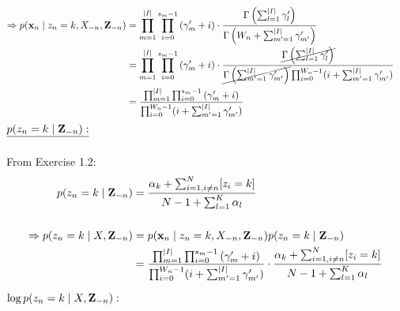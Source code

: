 \begin{enumerate}
\begin{align*}
        \\\\
        \Rightarrow p(\bold{x}_n \mid  z_n = k, X_{-n}, \mathbf{Z}_{-n}) &= \prod_{m=1}^{\vert I \vert}\prod_{i=0}^{s_m-1}\left(\gamma'_m + i\right) \cdot \frac{\Gamma\left(\sum_{l=1}^{\vert I \vert} \gamma'_l\right)}{\Gamma\left(W_n + \sum_{m'=1}^{\vert I \vert} \gamma'_{m'}\right)} 
        \\
        &= \prod_{m=1}^{\vert I \vert}\prod_{i=0}^{s_m-1}\left(\gamma'_m + i\right) \cdot \frac{\cancel{\Gamma\left(\sum_{l=1}^{\vert I \vert} \gamma'_l\right)}}{\cancel{\Gamma\left(\sum_{m'=1}^{\vert I \vert} \gamma'_{m'}\right)}\prod_{i=0}^{W_n-1}(i+\sum_{m'=1}^{\vert I \vert} \gamma'_{m'})} 
        \\
        &= \frac{\prod_{m=1}^{\vert I \vert}\prod_{i=0}^{s_m-1}\left(\gamma'_m + i\right)}{\prod_{i=0}^{W_n-1}(i+\sum_{m'=1}^{\vert I \vert} \gamma'_{m'})}
    \end{align*}
    \textbf{$\underline{p(z_n = k \mid \mathbf{Z}_{-n}):}$}
    \\\\
    From Exercise 1.2:
    \begin{align*}
       p(z_n = k \mid \mathbf{Z}_{-n}) &= \frac{\alpha_k + \sum_{i=1, i \neq n}^N[z_i = k]}{N - 1 + \sum_{l=1}^K \alpha_l} 
       \\\\
       \Rightarrow p(z_n = k \mid X, \mathbf{Z}_{-n}) &= p(\bold{x}_n \mid  z_n = k, X_{-n}, \mathbf{Z}_{-n})p(z_n = k \mid \mathbf{Z}_{-n})
       \\
       &= \frac{\prod_{m=1}^{\vert I \vert}\prod_{i=0}^{s_m-1}\left(\gamma'_m + i\right)}{\prod_{i=0}^{W_n-1}(i+\sum_{m'=1}^{\vert I \vert} \gamma'_{m'})} \cdot \frac{\alpha_k + \sum_{i=1, i \neq n}^N[z_i = k]}{N - 1 + \sum_{l=1}^K \alpha_l} 
    \end{align*}
    
    \underline{$\operatorname{log}p(z_n = k \mid X, \mathbf{Z}_{-n}):$}
    

\end{enumerate}

